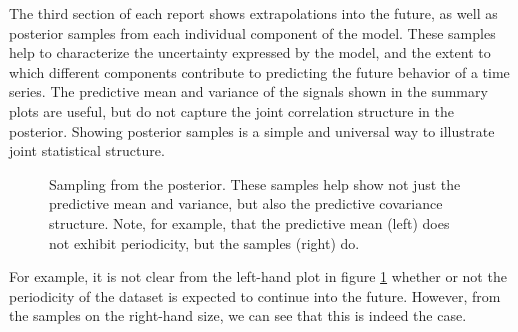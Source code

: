 \documentclass{article} %
\begin{document}
The third section of each report shows extrapolations into the future, as well as posterior samples from each individual component of the model.  These samples help to characterize the uncertainty expressed by the model, and the extent to which different components contribute to predicting the future behavior of a time series.
%
The predictive mean and variance of the signals shown in the summary plots are useful, but do not capture the joint correlation structure in the posterior.  Showing posterior samples is a simple and universal way to illustrate joint statistical structure.
%
\begin{figure}[ht]
\centering
{}
\caption{Sampling from the posterior.  These samples help show not just the predictive mean and variance, but also the predictive covariance structure.  Note, for example, that the predictive mean (left) does not exhibit periodicity, but the samples (right) do.}
\label{fig:extrap-full}
\end{figure}
%
For example,
it is not clear from the left-hand plot in figure \ref{fig:extrap-full} whether or not the periodicity of the dataset is expected to continue into the future.  However, from the samples on the right-hand size, we can see that this is indeed the case.  

\end{document}

